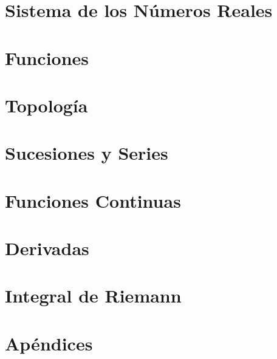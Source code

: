 \documentclass[letterpaper,10pt,fleqn,final,twoside]{book}
\author{Jhonny Lanzuisi}
\begin{document}
 
\frontmatter
	\begin{titlepage}
		
	\end{titlepage}


\tableofcontents


\mainmatter

\part{Sistema de los Números Reales}
\label{prt:Numeros Reales}





\part{Funciones} %
\label{prt:Funciones}




\part[Topología]{Topología}
\label{prt:topologia}



\part{Sucesiones y Series}
\label{prt:sucesionesSeries}


\part{Funciones Continuas} %
\label{prt:Funciones Continuas}

\part{Derivadas} %
\label{prt:Derivadas}

\part{Integral de Riemann} %
\label{prt:Integral de Riemann}

\appendix
\part{Apéndices}


\backmatter
\printbibliography[
heading=bibintoc,
title={Referencias}
]
\printindex
\listoffigures
\listoftables
\end{document}
